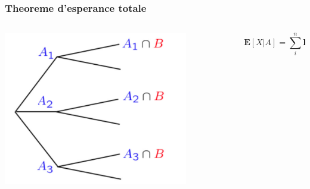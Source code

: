 \documentclass{beamer}
\renewcommand{\P}{\mathbf{P}}
\newcommand{\E}{\mathbf{E}}
\begin{document}
\begin{frame}[t]
  \frametitle{Theoreme d'esperance totale}
 \begin{columns}
   \begin{column}{0.4\textwidth}
      \centering
      \includegraphics[width=0.8\textwidth]{./total_expectation.png}
      \pause
      
   \end{column}
   \begin{column}{0.6\textwidth}
     \scriptsize
   {
     \vspace*{1cm}
     \begin{tcolorbox}[title=Esparance totale]
       \scriptsize
      $$
      \E[X|A] = \sum_i^n \P(A_i)\E[X|A_i]
      $$
     \end{tcolorbox}
     
   }
   \end{column}
 \end{columns} 
\end{frame}
\end{document}
